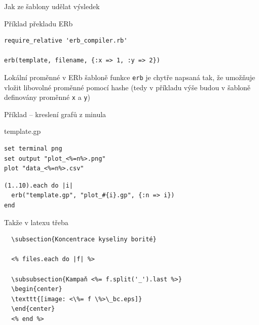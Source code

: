 \documentclass{beamer}
\begin{document}
\begin{frame}[fragile]{Jak ze šablony udělat výsledek}
  \scriptsize
  \begin{block}{Příklad překladu ERb}
    \scriptsize
    \begin{verbatim}
require_relative 'erb_compiler.rb'

erb(template, filename, {:x => 1, :y => 2})
    \end{verbatim}
  \end{block}
  \begin{block}{Lokální proměnné v ERb šabloně}
    \scriptsize
    funkce \texttt{erb} je chytře napsaná tak, že umožňuje vložit libovolné proměnné pomocí hashe (tedy v příkladu výše budou v šabloně definovány proměnné \texttt{x} a \texttt{y})
  \end{block}
\end{frame}

\begin{frame}[fragile]{Příklad -- kreslení grafů z minula}
  \begin{block}{template.gp}
    \scriptsize
    \begin{verbatim}
set terminal png
set output "plot_<%=n%>.png"
plot "data_<%=n%>.csv"
    \end{verbatim}
  \end{block}
  \begin{block}{}
    \scriptsize
    \begin{verbatim}
(1..10).each do |i|
  erb("template.gp", "plot_#{i}.gp", {:n => i})
end
    \end{verbatim}
  \end{block}
\end{frame}

\begin{frame}[fragile]{Takže v latexu třeba}
\scriptsize
\begin{verbatim}
  \subsection{Koncentrace kyseliny borité}

  <% files.each do |f| %>

  \subsubsection{Kampaň <%= f.split('_').last %>}
  \begin{center}
  \texttt{[image: <\%= f \%>\_bc.eps]}
  \end{center}
  <% end %>
\end{verbatim}
\end{frame}
\end{document}
